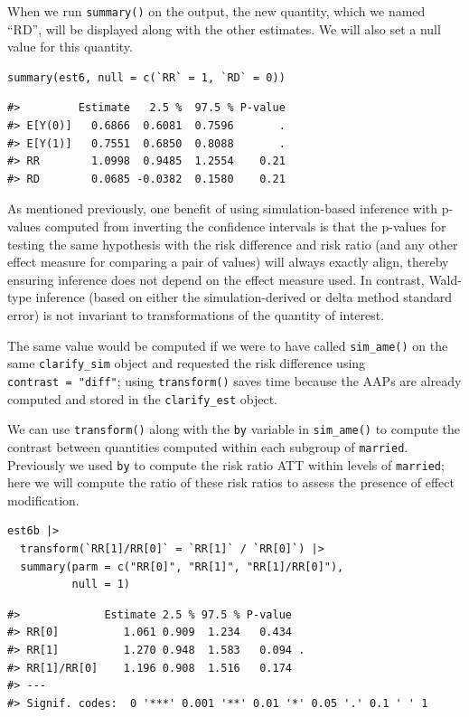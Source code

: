 When we run \texttt{summary()} on the output, the new quantity, which we named ``RD'', will be displayed along with the other estimates. We will also set a null value for this quantity.

\begin{verbatim}
summary(est6, null = c(`RR` = 1, `RD` = 0))
\end{verbatim}

\begin{verbatim}
#>         Estimate   2.5 %  97.5 % P-value
#> E[Y(0)]   0.6866  0.6081  0.7596       .
#> E[Y(1)]   0.7551  0.6850  0.8088       .
#> RR        1.0998  0.9485  1.2554    0.21
#> RD        0.0685 -0.0382  0.1580    0.21
\end{verbatim}

As mentioned previously, one benefit of using simulation-based inference with p-values computed from inverting the confidence intervals is that the p-values for testing the same hypothesis with the risk difference and risk ratio (and any other effect measure for comparing a pair of values) will always exactly align, thereby ensuring inference does not depend on the effect measure used. In contrast, Wald-type inference (based on either the simulation-derived or delta method standard error) is not invariant to transformations of the quantity of interest.

The same value would be computed if we were to have called \texttt{sim\_ame()} on the same \texttt{clarify\_sim} object and requested the risk difference using \texttt{contrast\ =\ "diff"}; using \texttt{transform()} saves time because the AAPs are already computed and stored in the \texttt{clarify\_est} object.

We can use \texttt{transform()} along with the \texttt{by} variable in \texttt{sim\_ame()} to compute the contrast between quantities computed within each subgroup of \texttt{married}. Previously we used \texttt{by} to compute the risk ratio ATT within levels of \texttt{married}; here we will compute the ratio of these risk ratios to assess the presence of effect modification.

\begin{verbatim}
est6b |>
  transform(`RR[1]/RR[0]` = `RR[1]` / `RR[0]`) |>
  summary(parm = c("RR[0]", "RR[1]", "RR[1]/RR[0]"),
          null = 1)
\end{verbatim}

\begin{verbatim}
#>             Estimate 2.5 % 97.5 % P-value  
#> RR[0]          1.061 0.909  1.234   0.434  
#> RR[1]          1.270 0.948  1.583   0.094 .
#> RR[1]/RR[0]    1.196 0.908  1.516   0.174  
#> ---
#> Signif. codes:  0 '***' 0.001 '**' 0.01 '*' 0.05 '.' 0.1 ' ' 1
\end{verbatim}

